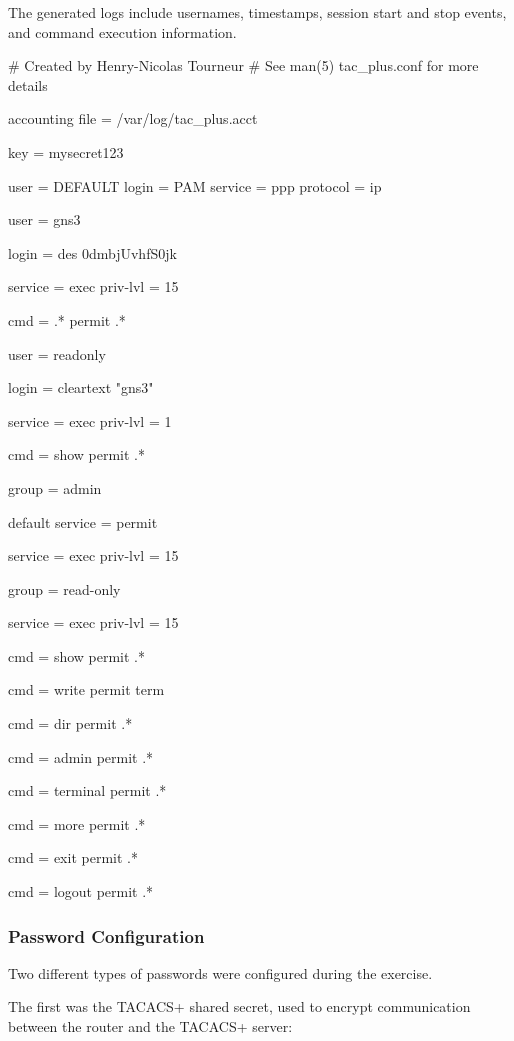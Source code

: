 \documentclass[12pt]{article}
\begin{document}
The generated logs include usernames, timestamps,
session start and stop events, and command execution
information.

\begin{largeconfigbox}
# Created by Henry-Nicolas Tourneur
# See man(5) tac_plus.conf for more details

accounting file = /var/log/tac_plus.acct

key = mysecret123

user = DEFAULT {
    login = PAM
    service = ppp protocol = ip {}
}

user = gns3 {
    login = des 0dmbjUvhfS0jk

    service = exec {
        priv-lvl = 15
    }

    cmd = .* {
        permit .*
    }
}

user = readonly {
    login = cleartext "gns3"

    service = exec {
        priv-lvl = 1
    }

    cmd = show {
        permit .*
    }
}

group = admin {
    default service = permit

    service = exec {
        priv-lvl = 15
    }
}

group = read-only {
    service = exec {
        priv-lvl = 15
    }

    cmd = show {
        permit .*
    }

    cmd = write {
        permit term
    }

    cmd = dir {
        permit .*
    }

    cmd = admin {
        permit .*
    }

    cmd = terminal {
        permit .*
    }

    cmd = more {
        permit .*
    }

    cmd = exit {
        permit .*
    }

    cmd = logout {
        permit .*
    }
}
\end{largeconfigbox}

\subsubsection{Password Configuration}

Two different types of passwords were configured during the exercise.

The first was the TACACS+ shared secret, used to encrypt
communication between the router and the TACACS+ server:
\end{document}

